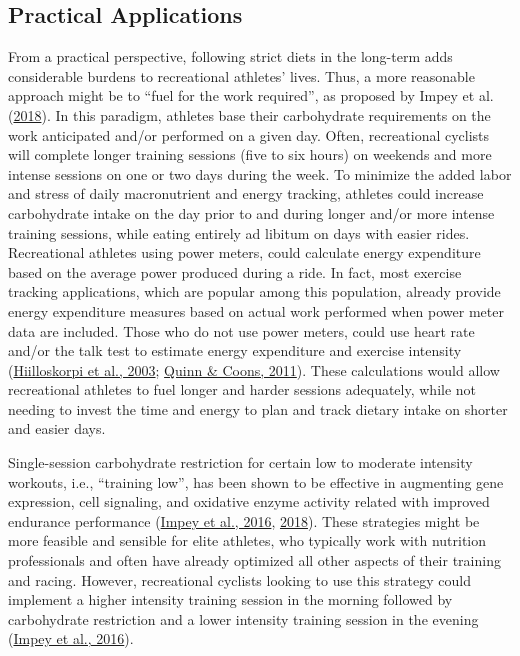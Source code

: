 \documentclass[]{cik}%
\begin{document}
\hypertarget{practical-applications}{%
\subsection{Practical Applications}\label{practical-applications}}

From a practical perspective, following strict diets in the long-term
adds considerable burdens to recreational athletes' lives. Thus, a more
reasonable approach might be to ``fuel for the work required'', as
proposed by Impey et al. (\protect\hyperlink{ref-67}{2018}). In this
paradigm, athletes base their carbohydrate requirements on the work
anticipated and/or performed on a given day. Often, recreational
cyclists will complete longer training sessions (five to six hours) on
weekends and more intense sessions on one or two days during the week.
To minimize the added labor and stress of daily macronutrient and energy
tracking, athletes could increase carbohydrate intake on the day prior
to and during longer and/or more intense training sessions, while eating
entirely ad libitum on days with easier rides. Recreational athletes
using power meters, could calculate energy expenditure based on the
average power produced during a ride. In fact, most exercise tracking
applications, which are popular among this population, already provide
energy expenditure measures based on actual work performed when power
meter data are included. Those who do not use power meters, could use
heart rate and/or the talk test to estimate energy expenditure and
exercise intensity (\protect\hyperlink{ref-68}{Hiilloskorpi et al.,
2003}; \protect\hyperlink{ref-69}{Quinn \& Coons, 2011}). These
calculations would allow recreational athletes to fuel longer and harder
sessions adequately, while not needing to invest the time and energy to
plan and track dietary intake on shorter and easier days.

Single-session carbohydrate restriction for certain low to moderate
intensity workouts, i.e., ``training low'', has been shown to be
effective in augmenting gene expression, cell signaling, and oxidative
enzyme activity related with improved endurance performance
(\protect\hyperlink{ref-70}{Impey et al., 2016},
\protect\hyperlink{ref-67}{2018}). These strategies might be more
feasible and sensible for elite athletes, who typically work with
nutrition professionals and often have already optimized all other
aspects of their training and racing. However, recreational cyclists
looking to use this strategy could implement a higher intensity training
session in the morning followed by carbohydrate restriction and a lower
intensity training session in the evening
(\protect\hyperlink{ref-70}{Impey et al., 2016}).
\end{document}

